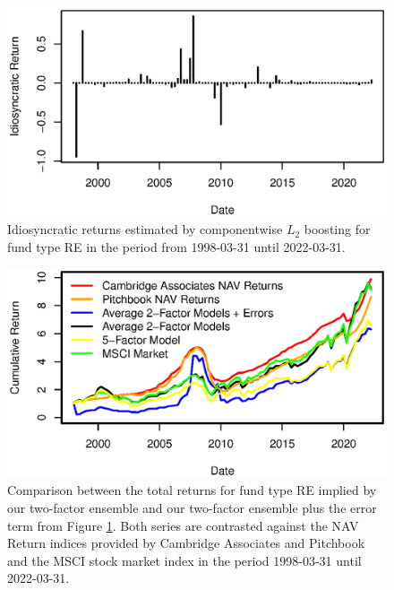 \begin{figure}[H]
	\centering
	\includegraphics{Figures/XErrorSeriesRE}
	\caption{Idiosyncratic returns estimated by componentwise $L_2$ boosting for fund type RE in the period from 1998-03-31 until 2022-03-31.}
	\label{fig:clb_idio_re}
\end{figure}

\begin{figure}[H]
	\centering
	\includegraphics{Figures/XTotalErrorSeriesRE}
	\caption{
		Comparison between the total returns for fund type RE implied by our two-factor ensemble and our two-factor ensemble plus the error term from Figure \ref{fig:clb_idio_re}.
		Both series are contrasted against the NAV Return indices provided by Cambridge Associates and Pitchbook and the MSCI stock market index in the period 1998-03-31 until 2022-03-31.
	}
	\label{fig:clb_total_re}
\end{figure}

